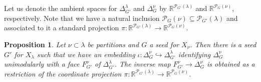 \documentclass{amsart}
\newtheorem{prop}[thm]{Proposition}
\theoremstyle{definition}
\numberwithin{equation}{section}
\newcommand{\R}{\mathbb R}
\begin{document}
Let us denote the ambient spaces for $\Delta^\lambda_{G'}$ and $\Delta^\nu_{G}$ by $\R^{\mathcal P_{G'}(\lambda)}$ and $\R^{\mathcal P_{G}(\nu)}$, respectively. Note that we have a natural inclusion $\mathcal P_{G}(\nu)\subseteq\mathcal P_{G'}(\lambda)$ and associated to it a standard projection $\pi:\R^{\mathcal P_{G'}(\lambda)}\to\R^{\mathcal P_{G}(\nu)}$. 

\begin{prop}\label{p:FaceProp}
Let $\nu\subset\lambda$ be partitions and $G$ a seed for $X_\nu$. Then there is a seed $G'$ for $X_\lambda$ such that we have an  embedding $\iota:\Delta^\nu_G\hookrightarrow\Delta^\lambda_{G'}$ identifying $\Delta^\nu_G$ unimodularly with a face $F_{G'}^\nu$ of $\Delta^\lambda_{G'}$.
The inverse map $F_{G'}^\nu\to \Delta^\nu_{G}$ is obtained as a restriction of the coordinate projection $\pi:\R^{\mathcal P_{G'}(\lambda)}\to\R^{\mathcal P_{G}(\nu)}$.
\end{prop}
\end{document}

